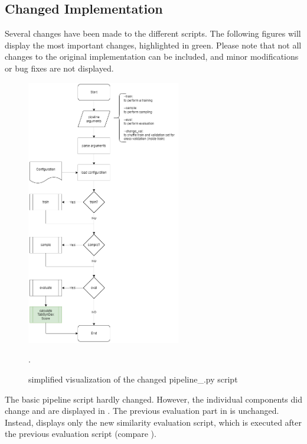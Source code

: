 \subsection[]{Changed Implementation}
\label{A:Changed_implementation}
Several changes have been made to the different scripts.
The following figures will display the most important changes, highlighted in green.
Please note that not all changes to the original implementation can be included, and minor modifications or bug fixes are not displayed.

\begin{figure}[H]
	\centering
	\includegraphics[width=0.6\textwidth]{images/pipeline-CHANGED.png}
	\caption[Pipeline Script Changes]{simplified visualization of the changed pipeline\_\*.py script}
	\label{fig:a_pipeline_changed}.
\end{figure}

The basic pipeline script hardly changed.
However, the individual components did change and are displayed in .
The previous evaluation part in  is unchanged.
Instead,  displays only the new similarity evaluation script, which is
executed after the previous evaluation script (compare ).

